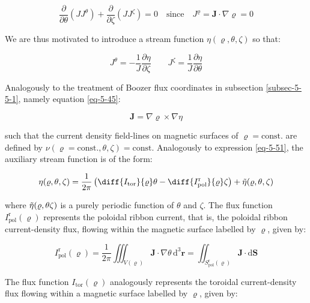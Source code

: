 \begin{equation}
    \frac{\partial}{\partial\theta}\left(JJ^\theta\right)+\frac{\partial}{\partial\zeta}\left(JJ^\zeta\right)=0\quad\text{since}\quad J^\varrho=\mathbf{J}\cdot\nabla\varrho=0
\end{equation}

We are thus motivated to introduce a stream function $\eta(\varrho,\theta,\zeta)$ so that:

\begin{equation}
    J^\theta=-\frac{1}{J}\frac{\partial\eta}{\partial\zeta}\qquad J^\zeta=\frac{1}{J}\frac{\partial\eta}{\partial\theta}
\end{equation}

Analogously to the treatment of Boozer flux coordinates in subsection \ref{subsec-5-5-1}, namely equation \ref{eq-5-45}:

\begin{equation}
    \mathbf{J}=\nabla\varrho\times\nabla\eta
\end{equation}

such that the current density field-lines on magnetic surfaces of $\varrho=\text{const.}$ are defined by $\nu(\varrho=\text{const.},\theta,\zeta)=\text{const.}$ Analogously to expression \ref{eq-5-51}, the auxiliary stream function is of the form:

\begin{equation}
    \eta(\varrho,\theta,\zeta)=\frac{1}{2\pi}\left(\diff{I_\text{tor}}{\varrho}\theta-\diff{I_\text{pol}^\text{r}}{\varrho}\zeta\right)+\Tilde{\eta}(\varrho,\theta,\zeta)
\end{equation}

where $\Tilde{\eta}(\varrho,\theta\zeta)$ is a purely periodic function of $\theta$ and $\zeta$. The flux function $I_\text{pol}^\text{r}(\varrho)$ represents the poloidal ribbon current, that is, the poloidal ribbon current-density flux, flowing within the magnetic surface labelled by $\varrho$, given by:

\begin{equation}
    I_\text{pol}^\text{r}(\varrho)=\frac{1}{2\pi}\iiint_{V(\varrho)}\mathbf{J}\cdot\nabla\theta\,\mathrm{d}^3\mathbf{r}=\iint_{S_\text{pol}^\text{r}(\varrho)}\mathbf{J}\cdot\mathrm{d}\mathbf{S}
\end{equation}

The flux function $I_\text{tor}(\varrho)$ analogously represents the toroidal current-density flux flowing within a magnetic surface labelled by $\varrho$, given by:

